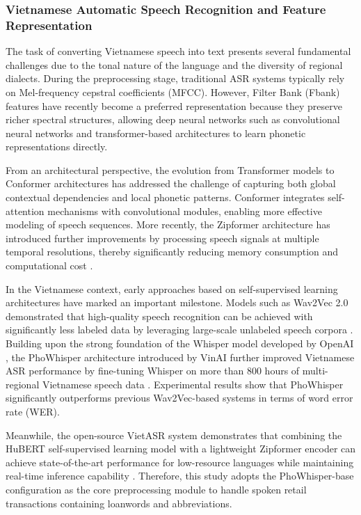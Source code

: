 \subsubsection{Vietnamese Automatic Speech Recognition and Feature Representation}
The task of converting Vietnamese speech into text presents several fundamental challenges due to the tonal nature of the language and the diversity of regional dialects. During the preprocessing stage, traditional ASR systems typically rely on Mel-frequency cepstral coefficients (MFCC). However, Filter Bank (Fbank) features have recently become a preferred representation because they preserve richer spectral structures, allowing deep neural networks such as convolutional neural networks and transformer-based architectures to learn phonetic representations directly.

From an architectural perspective, the evolution from Transformer models to Conformer architectures has addressed the challenge of capturing both global contextual dependencies and local phonetic patterns. Conformer integrates self-attention mechanisms with convolutional modules, enabling more effective modeling of speech sequences. More recently, the Zipformer architecture has introduced further improvements by processing speech signals at multiple temporal resolutions, thereby significantly reducing memory consumption and computational cost \parencite{yao2024zipformer}.

In the Vietnamese context, early approaches based on self-supervised learning architectures have marked an important milestone. Models such as Wav2Vec 2.0 demonstrated that high-quality speech recognition can be achieved with significantly less labeled data by leveraging large-scale unlabeled speech corpora \parencite{baevski2020wav2vec}. Building upon the strong foundation of the Whisper model developed by OpenAI \parencite{radford2023robust}, the PhoWhisper architecture introduced by VinAI further improved Vietnamese ASR performance by fine-tuning Whisper on more than 800 hours of multi-regional Vietnamese speech data \parencite{le2024phowhisper}. Experimental results show that PhoWhisper significantly outperforms previous Wav2Vec-based systems in terms of word error rate (WER).

Meanwhile, the open-source VietASR system demonstrates that combining the HuBERT self-supervised learning model \parencite{hsu2021hubert} with a lightweight Zipformer encoder can achieve state-of-the-art performance for low-resource languages while maintaining real-time inference capability \parencite{zhuo2025vietasr}. Therefore, this study adopts the PhoWhisper-base configuration as the core preprocessing module to handle spoken retail transactions containing loanwords and abbreviations.

